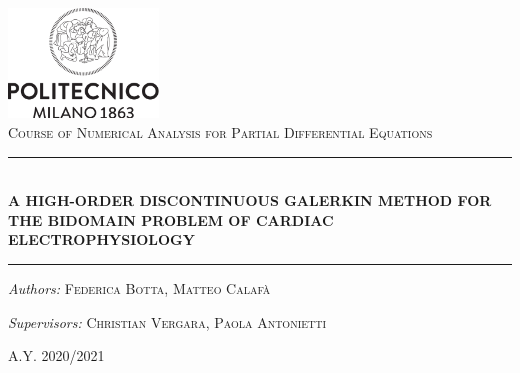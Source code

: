 \documentclass[a4paper,11pt]{article}
\begin{document}
	
	\begin{titlepage}
	    \thispagestyle{empty}
	    \begin{center}
	    	\includegraphics[width = 4cm]{./polimi-logo.png}\\ \vspace{3mm}
	    	\normalsize{\textsc{Course of Numerical Analysis for Partial Differential Equations}}
	    	
	    	\vspace{20mm}
	    	\rule{15cm}{0.1mm} \\ \vspace{4.5mm}
	    	 \Huge{\textbf{A HIGH-ORDER DISCONTINUOUS GALERKIN METHOD FOR THE BIDOMAIN PROBLEM OF CARDIAC ELECTROPHYSIOLOGY}} \\
	    	\rule{15cm}{0.1mm}
	    \end{center}
	    	\vspace{25mm}
	    	
	    	\Large{
	    	\hspace{11mm} \emph{Authors:} \hspace{5mm} \textsc{ \quad Federica Botta, Matteo Calafà}} \newline
	    	 
	    	\Large{\vspace{3mm} 
	    	 \hspace{4mm} \emph{Supervisors:} \hspace{3mm} \textsc{ Christian Vergara, Paola Antonietti}}
	          \\
	    	\vspace{20mm}
	    \begin{center}
	    	\large{\textsc{A.Y. 2020/2021}}
	    \end{center}
	\end{titlepage}



    \restoregeometry
    
    \tableofcontents
    \newpage
    
\end{document}

